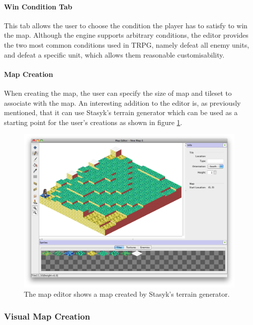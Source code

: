 \paragraph{Win Condition Tab\\}
This tab allows the user to choose the condition the player has to satisfy to win the map. Although the engine supports arbitrary conditions, the editor provides the two most common conditions used in TRPG, namely defeat all enemy units, and defeat a specific unit, which allows them  reasonable customisability.

\paragraph{Map Creation\\}
When creating the map, the user can specify the size of map and tileset to associate with the map.  An interesting addition to the editor is, as previously  mentioned, that it can use Stasyk's terrain generator which can be used as a starting point for the user's creations as shown in figure \ref{fig:figures_editor_gen}.

\begin{figure}[htb]
	\centering
		\includegraphics[width=\textwidth]{figures/editor/gen.png}
	\caption{The map editor shows a map created by Stasyk's terrain generator.}
	\label{fig:figures_editor_gen}
\end{figure}

\subsubsection{Visual Map Creation}
\label{ssub:visual_map_creation}

